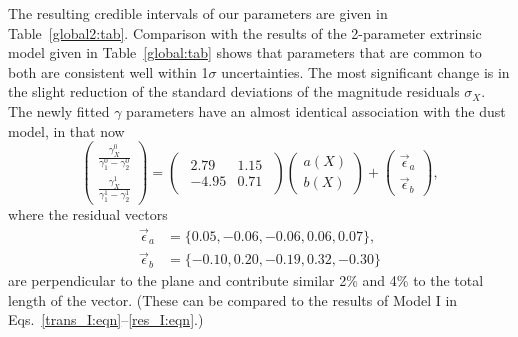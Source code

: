 \documentclass{aastex61}   	%
\begin{document}
The resulting credible intervals of our parameters are given in Table~\ref{global2:tab}.  Comparison with the
results of the 2-parameter extrinsic model given in Table~\ref{global:tab} shows that  parameters that are common to both
are consistent well within 1$\sigma$ uncertainties.  The most significant change is in the slight reduction of the standard
deviations of the magnitude residuals $\sigma_X$.
The newly fitted $\gamma$ parameters have an almost identical association with the   dust model, in that now
\begin{equation}
\begin{pmatrix}
 \frac{\gamma^0_X}{\gamma^0_1-\gamma^0_2} \\
\frac{\gamma^1_X}{\gamma^1_1-\gamma^1_2} 
\end{pmatrix}=
\begin{pmatrix}
\begin{array}{rr}
2.79 & 1.15 \\
-4.95 & 0.71
\end{array}
\end{pmatrix} 
\begin{pmatrix}
a(X) \\
b(X)
\end{pmatrix}+
\begin{pmatrix}
\vec{\epsilon}_a \\
\vec{\epsilon}_b
\end{pmatrix},
\end{equation}
where the residual vectors 
\begin{align}
\vec{\epsilon}_a &=\{0.05, -0.06, -0.06,  0.06,  0.07\},\\
\vec{\epsilon}_b &=\{ -0.10, 0.20,  -0.19,  0.32, -0.30\}
\end{align}
\label{model11trans:eqn}
are perpendicular to the   plane and
contribute similar 2\% and 4\% to the total  length of the vector.
(These can be compared to the results of Model I in Eqs.\ \ref{trans_I:eqn}--\ref{res_I:eqn}.)
\end{document}
